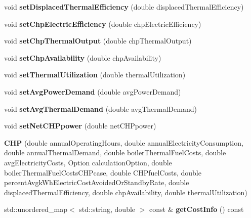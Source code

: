 \begin{DoxyCompactItemize}
void {\bfseries set\+Displaced\+Thermal\+Efficiency} (double displaced\+Thermal\+Efficiency)
\item 
\mbox{\label{class_c_h_p_a63de982e8324e669ea8a6712a30a6ce4}} 
void {\bfseries set\+Chp\+Electric\+Efficiency} (double chp\+Electric\+Efficiency)
\item 
\mbox{\label{class_c_h_p_a4b132e4e600df80fa87c0e7b680733b7}} 
void {\bfseries set\+Chp\+Thermal\+Output} (double chp\+Thermal\+Output)
\item 
\mbox{\label{class_c_h_p_a0dc3c1f0e0b67564a56b5863c1abf974}} 
void {\bfseries set\+Chp\+Availability} (double chp\+Availability)
\item 
\mbox{\label{class_c_h_p_a8917dfa8b8a68244d0ffe3fd3ca1d13f}} 
void {\bfseries set\+Thermal\+Utilization} (double thermal\+Utilization)
\item 
\mbox{\label{class_c_h_p_a4f3183df776744f6871fb59b07553d2c}} 
void {\bfseries set\+Avg\+Power\+Demand} (double avg\+Power\+Demand)
\item 
\mbox{\label{class_c_h_p_a0036fd3fc3154adc0fdba0ede8277bee}} 
void {\bfseries set\+Avg\+Thermal\+Demand} (double avg\+Thermal\+Demand)
\item 
\mbox{\label{class_c_h_p_a625efb308ccd22c8bdf75f082ff7bae2}} 
void {\bfseries set\+Net\+C\+H\+Ppower} (double net\+C\+H\+Ppower)
\item 
\mbox{\label{class_c_h_p_aea45a2afd5189214fbf720e53d587640}} 
{\bfseries C\+HP} (double annual\+Operating\+Hours, double annual\+Electricity\+Consumption, double annual\+Thermal\+Demand, double boiler\+Thermal\+Fuel\+Costs, double avg\+Electricity\+Costs, Option calculation\+Option, double boiler\+Thermal\+Fuel\+Costs\+C\+H\+Pcase, double C\+H\+Pfuel\+Costs, double percent\+Avgk\+Wh\+Electric\+Cost\+Avoided\+Or\+Standby\+Rate, double displaced\+Thermal\+Efficiency, double chp\+Availability, double thermal\+Utilization)
\item 
\mbox{\label{class_c_h_p_a9b448b253454087f9e98124aa716715f}} 
std\+::unordered\+\_\+map$<$ std\+::string, double $>$ const  \& {\bfseries get\+Cost\+Info} () const

\end{DoxyCompactItemize}

